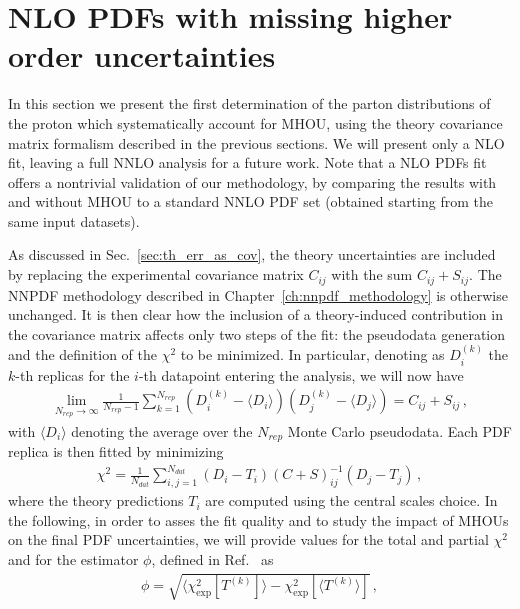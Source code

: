     
    \section{NLO PDFs with missing higher order uncertainties}
    \label{sec:th_error_results}
    In this section we present the first determination of the parton distributions of the proton 
    which systematically account for MHOU,
    using the theory covariance matrix formalism described in the previous sections.
    We will present only a NLO fit, leaving a full NNLO analysis for a future work.
    Note that a NLO PDFs fit offers a nontrivial validation of our methodology, by comparing the results with and without MHOU to 
    a standard NNLO PDF set (obtained starting from the same input datasets).

    As discussed in Sec.~\ref{sec:th_err_as_cov}, the theory uncertainties are included by replacing the
    experimental covariance matrix $C_{ij}$ with the sum $C_{ij}+S_{ij}$. The NNPDF methodology 
    described in Chapter~\ref{ch:nnpdf_methodology} is otherwise unchanged.
    It is then clear how the inclusion of a theory-induced contribution in the covariance matrix affects only two steps
    of the fit: the pseudodata generation and the definition of the $\chi^2$ to be minimized.
    In particular, denoting as $D_i^{(k)}$ the $k$-th replicas for the $i$-th datapoint entering the analysis,
    we will now have
    \begin{align}
        \lim_{N_{rep}\rightarrow \infty}\frac{1}{N_{rep}-1}
        \sum_{k=1}^{N_{rep}}\left(D_i^{(k)}-\langle D_i \rangle\right)\left(D_j^{(k)}-\langle D_j \rangle\right)
        = C_{ij} + S_{ij}\,,
    \end{align}
    with $\langle D_i \rangle$ denoting the average over the $N_{rep}$ Monte Carlo pseudodata.
    Each PDF replica is then fitted by minimizing 
    \begin{align}
        \chi^2 = \frac{1}{N_{dat}}\sum_{i,j=1}^{N_{dat}}
        \left(D_i - T_i\right)\left(C+S\right)_{ij}^{-1}\left(D_j-T_j\right)\,,
    \end{align}
    where the theory predictions $T_i$ are computed using the central scales choice.
    In the following, in order to asses the fit quality and to study the impact of MHOUs on the final
    PDF uncertainties, we will provide values for the total and partial $\chi^2$ and for the estimator
    $\phi$, defined in Ref.~\cite{Ball:2014uwa} as
    \begin{align}
        \label{eq:phi}
        \phi = \sqrt{\langle \chi^2_{\text{exp}}\left[T^{(k)}\right] \rangle 
        - \chi^2_{\text{exp}}\left[\langle T^{(k)} \rangle\right]}\,,
    \end{align}
